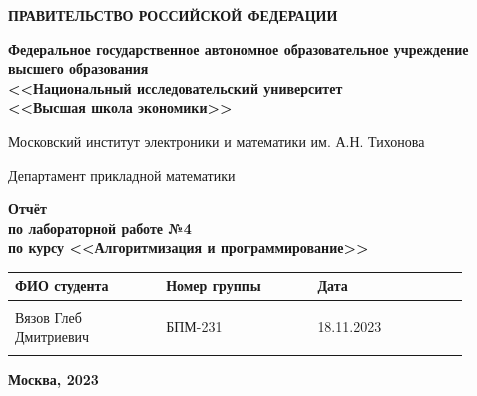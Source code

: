\documentclass[12pt]{article}
\begin{document}
\thispagestyle{empty}
\begin{center}
\textbf{ПРАВИТЕЛЬСТВО РОССИЙСКОЙ ФЕДЕРАЦИИ}

\vspace{5ex}
	
\textbf{Федеральное государственное автономное образовательное учреждение \\ высшего образования \\ <<Национальный исследовательский университет \\ <<Высшая школа экономики>>}
\end{center}
\vspace{5ex}

\begin{center}
    Московский институт электроники и математики им. А.Н. Тихонова  
    
    \vspace{5ex}
    
    Департамент прикладной математики
    
    \vspace{10ex}
    \textbf{Отчёт \\ по лабораторной работе №4 \\ по курсу <<Алгоритмизация и программирование>>}
	\vspace{7ex}

\end{center}

\begin{center} 
\begin{tabular}{| p{0.3\linewidth}| p{0.3\linewidth}| p{0.3\linewidth}|}
 \hline	
ФИО студента & Номер группы & Дата \\  \hline
 & & \\  
Вязов Глеб \newline Дмитриевич & БПМ-231 & 18.11.2023\\  
 & & \\  \hline		
\end{tabular}
\end{center}

\begin{center}
	\vspace{3ex}
	
	\vfill
   
   \normalsize
    
	\textbf{Москва, 2023}
\end{center}

\newpage

\end{document}
